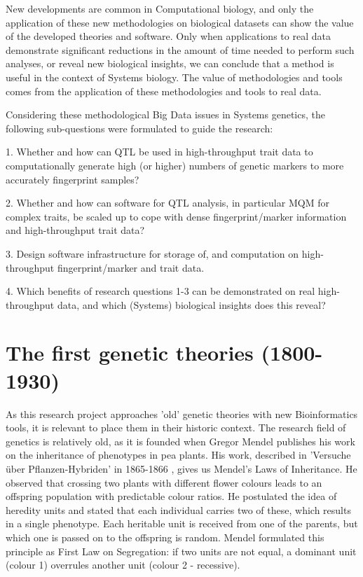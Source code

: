 New developments are common in Computational biology, and only the application of these new methodologies on biological 
datasets can show the value of the developed theories and software. Only when applications to real data demonstrate 
significant reductions in the amount of time needed to perform such analyses, or reveal new biological insights, we can 
conclude that a method is useful in the context of Systems biology. The value of methodologies and tools comes from the 
application of these methodologies and tools to real data. 

Considering these methodological Big Data issues in Systems genetics, the following sub-questions were formulated to 
guide the research: 

1. Whether and how can QTL be used in high-throughput trait data to computationally generate high (or higher) numbers of genetic markers to more accurately fingerprint samples? 

2. Whether and how can software for QTL analysis, in particular MQM for complex traits, be scaled up to cope with dense fingerprint/marker information and high-throughput trait data?

3. Design software infrastructure for storage of, and computation on high-throughput fingerprint/marker and trait data.

4. Which benefits of research questions 1-3 can be demonstrated on real high-throughput data, and which (Systems) biological insights does this reveal? 

\section{The first genetic theories (1800-1930)}
As this research project approaches 'old' genetic theories with new Bioinformatics tools, it is relevant to place 
them in their historic context. The research field of genetics is relatively old, as it is founded when Gregor 
Mendel publishes his work on the inheritance of phenotypes in pea plants. His work, described in 'Versuche \"uber 
Pflanzen-Hybriden' in 1865-1866 \cite{Mendel:1866}, gives us Mendel's Laws of Inheritance. He observed that crossing 
two plants with different flower colours leads to an offspring population with predictable colour ratios. He 
postulated the idea of heredity units and stated that each individual carries two of these, which results in a 
single phenotype. Each heritable unit is received from one of the parents, but which one is passed on to the 
offspring is random. Mendel formulated this principle as First Law on Segregation: if two units are not equal, 
a dominant unit (colour 1) overrules another unit (colour 2 - recessive). 

